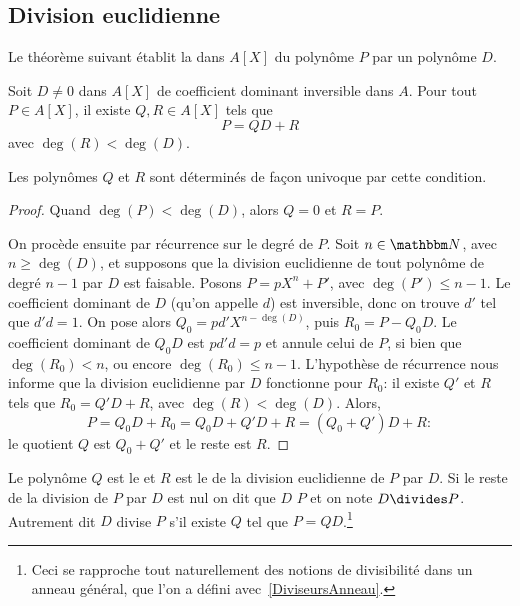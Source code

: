 \subsection{Division euclidienne}

Le théorème suivant établit la  dans \( A[X]\) du polynôme \( P\) par un polynôme \( D\).
\begin{theorem}     \label{ThodivEuclPsFexf}
    Soit \( D\neq 0\) dans \( A[X]\) de coefficient dominant inversible dans \( A\). Pour tout \( P\in A[X]\), il existe \( Q,R\in A[X]\) tels que
    \begin{equation}
        P=QD+R
    \end{equation}
    avec \( \deg(R)<\deg(D)\).

    Les polynômes \( Q\) et \( R\) sont déterminés de façon univoque par cette condition.
\end{theorem}

\begin{proof}
Quand \(\deg(P) < \deg(D) \), alors \( Q = 0 \) et \( R = P \).

On procède ensuite par récurrence sur le degré de \( P \). Soit \( n \in \eN\), avec \( n \geq \deg(D) \), et supposons que la division euclidienne de tout polynôme de degré \( n-1  \) par \( D \) est faisable. Posons \( P = pX^n + P' \), avec \( \deg(P') \leq n - 1 \). Le coefficient dominant de \( D \) (qu'on appelle \( d \))  est inversible, donc on trouve \( d' \) tel que \( d'd = 1 \). On pose alors \( Q_0 = pd'X^{n-\deg(D)} \), puis \(R_0 = P - Q_0D \). Le coefficient dominant de \( Q_0D \) est \( pd'd = p \) et annule celui de \( P \), si bien que \(\deg(R_0) < n \), ou encore \(\deg(R_0) \leq n - 1 \). L'hypothèse de récurrence nous informe que la division euclidienne par \( D \) fonctionne pour \( R_0 \): il existe \( Q' \) et \( R \) tels que \( R_0 = Q'D + R \), avec \( \deg(R)<\deg(D)\). Alors,
\begin{equation}
P = Q_0D + R_0 = Q_0D + Q'D + R = (Q_0 + Q') D + R:
\end{equation}
le quotient \( Q \) est \(Q_0 + Q'\) et le reste est \(R \).
\end{proof}

\begin{definition}\label{DefMPZooMmMymG}
    Le polynôme \( Q\) est le  et \( R\) est le  de la division euclidienne de \( P\) par \( D\). Si le reste de la division de \( P\) par $D$ est nul on dit que \( D\)  \( P\) et on note \( D\divides P\). Autrement dit \( D\) divise \( P\) s'il existe \( Q\) tel que \( P=QD\).\footnote{Ceci se rapproche tout naturellement des notions de divisibilité dans un anneau général, que l'on a défini avec~\ref{DiviseursAnneau}.}
\end{definition}

